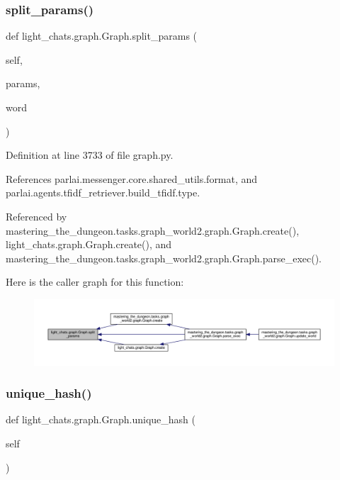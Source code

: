 \subsubsection{\texorpdfstring{split\+\_\+params()}{split\_params()}}
{\footnotesize\ttfamily def light\+\_\+chats.\+graph.\+Graph.\+split\+\_\+params (\begin{DoxyParamCaption}\item[{}]{self,  }\item[{}]{params,  }\item[{}]{word }\end{DoxyParamCaption})}



Definition at line 3733 of file graph.\+py.



References parlai.\+messenger.\+core.\+shared\+\_\+utils.\+format, and parlai.\+agents.\+tfidf\+\_\+retriever.\+build\+\_\+tfidf.\+type.



Referenced by mastering\+\_\+the\+\_\+dungeon.\+tasks.\+graph\+\_\+world2.\+graph.\+Graph.\+create(), light\+\_\+chats.\+graph.\+Graph.\+create(), and mastering\+\_\+the\+\_\+dungeon.\+tasks.\+graph\+\_\+world2.\+graph.\+Graph.\+parse\+\_\+exec().

Here is the caller graph for this function\+:
\nopagebreak
\begin{figure}[H]
\begin{center}
\leavevmode
\includegraphics[width=350pt]{classlight__chats_1_1graph_1_1Graph_a3d44dae0701925da960433cb98229c21_icgraph}
\end{center}
\end{figure}
\mbox{\label{classlight__chats_1_1graph_1_1Graph_a5f54739484e05010202517a4714af30f}} 
\subsubsection{\texorpdfstring{unique\+\_\+hash()}{unique\_hash()}}
{\footnotesize\ttfamily def light\+\_\+chats.\+graph.\+Graph.\+unique\+\_\+hash (\begin{DoxyParamCaption}\item[{}]{self }\end{DoxyParamCaption})}



